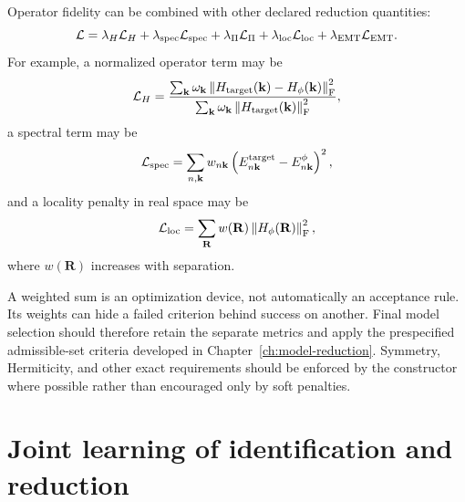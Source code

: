 Operator fidelity can be combined with other declared reduction quantities:
\begin{equation}
  \mathcal L
  =
  \lambda_H\mathcal L_H
  +\lambda_{\rm spec}\mathcal L_{\rm spec}
  +\lambda_{\Pi}\mathcal L_{\Pi}
  +\lambda_{\rm loc}\mathcal L_{\rm loc}
  +\lambda_{\rm EMT}\mathcal L_{\rm EMT}.
  \label{eq:composite-learning-loss}
\end{equation}
For example, a normalized operator term may be
\begin{equation}
  \mathcal L_H
  =
  \frac{
    \sum_{\mathbf k}\omega_{\mathbf k}
    \left\|H_{\rm target}(\mathbf k)-H_{\phi}(\mathbf k)\right\|_{\mathrm F}^{2}
  }{
    \sum_{\mathbf k}\omega_{\mathbf k}
    \left\|H_{\rm target}(\mathbf k)\right\|_{\mathrm F}^{2}
  },
\end{equation}
a spectral term may be
\begin{equation}
  \mathcal L_{\rm spec}
  =
  \sum_{n,\mathbf k}w_{n\mathbf k}
  \left(E_{n\mathbf k}^{\rm target}-E_{n\mathbf k}^{\phi}\right)^2,
\end{equation}
and a locality penalty in real space may be
\begin{equation}
  \mathcal L_{\rm loc}
  =
  \sum_{\mathbf R}w(\mathbf R)
  \left\|H_{\phi}(\mathbf R)\right\|_{\mathrm F}^{2},
\end{equation}
where $w(\mathbf R)$ increases with separation.

A weighted sum is an optimization device, not automatically an acceptance
rule. Its weights can hide a failed criterion behind success on another.
Final model selection should therefore retain the separate metrics and apply
the prespecified admissible-set criteria developed in
Chapter~\ref{ch:model-reduction}. Symmetry, Hermiticity, and other exact
requirements should be enforced by the constructor where possible rather than
encouraged only by soft penalties.

\section{Joint learning of identification and reduction}

